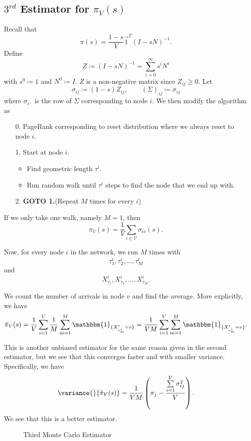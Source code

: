 \subsection{\(3^{rd}\) Estimator for \(\pi_V(s)\)}
Recall that
\[
	\pi(s) = \frac{1 - s}{V}\vec{1}^{T} (I - sN)^{-1}.
\]
Define
\[
	Z \coloneqq (I - sN)^{-1} = \sum\limits_{i=0}^{\infty} s^i N^i
\]
with \(s^0\coloneqq 1\) and \(N^0\coloneqq I\). \(Z\) is a non-negative matrix since \(Z_{ij}\geq 0\).
Let
\[
	\sigma_{ij}\coloneqq (1 - s)Z_{ij} , \qquad \left(\Sigma\right)_{ij}\coloneqq \sigma_{ij}
\]
where \(\sigma_{i\cdot}\) is the row of \(\Sigma\) corresponding to node \(i\). We then modify the algorithm as
\begin{enumerate}
	\item[0.] PageRank corresponding to reset distribution where we always reset to node \(i\).
	\item[1.] Start at node \(i\).
		\begin{itemize}
			\item Find geometric length \(\tau^i\).
			\item Run random walk until \(\tau^i\) steps to find the node that we end up with.
		\end{itemize}
	\item[2.] \textbf{GOTO 1.}(Repeat \(M\) times for every \(i\))
\end{enumerate}

If we only take one walk, namely \(M = 1\), then
\[
	\pi_V(s) = \frac{1}{V}\sum\limits_{i\in\mathcal{V}}\sigma_{iv}(s).
\]

Now, for every node \(i\) in the network, we run \(M\) times with
\[
	\tau^i_1, \tau^i_2, \ldots , \tau^i_M
\]
and
\[
	X_{\tau_1}^i, X_{\tau_2}^i, \ldots , X_{\tau_M}^i.
\]

We count the number of arrivals in node \(v\) and find the average. More explicitly, we have
\[
	\hat{\pi}_V(s) = \frac{1}{V}\sum\limits_{i=1}^{V} \frac{1}{M}\sum\limits_{m=1}^{M} \mathbbm{1}_{\{X^i_{\tau^i_m} = v\}} = \frac{1}{VM}\sum\limits_{i=1}^{V} \sum\limits_{m=1}^{M} \mathbbm{1}_{\{X^i_{\tau^i_m} = v\}} .
\]

This is another unbiased estimator for the same reason given in the second estimator, but we see that this converges faster and with smaller variance. Specifically, we have
\[
	\variance{}{\hat{\pi}_V(s)} = \frac{1}{VM}\left(\pi_{j} - \frac{\sum\limits_{i=1}^{V} \sigma_{ij}^2}{V}\right).
\]
We see that this is a better estimator.

\begin{figure}[H]
	\centering
	\caption{Third Monte Carlo Estimator}
	\label{fig:Monte-Carlo-Estimator-3}
\end{figure}